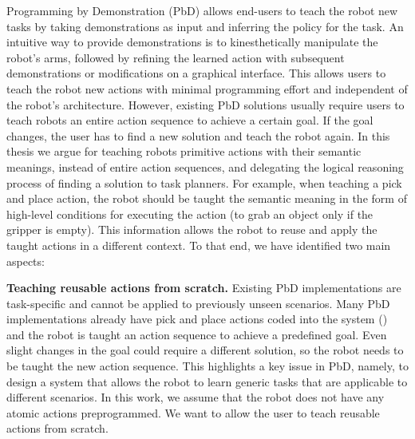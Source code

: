 Programming by Demonstration (PbD) allows end-users to teach the robot new tasks by taking demonstrations as input and inferring the policy for the task.
An intuitive way to provide demonstrations is to kinesthetically manipulate the robot's arms, followed by refining the learned action with subsequent demonstrations or modifications on a graphical interface.
This allows users to teach the robot new actions with minimal programming effort and independent of the robot's architecture.
However, existing PbD solutions usually require users to teach robots an entire action sequence to achieve a certain goal.
If the goal changes, the user has to find a new solution and teach the robot again.
In this thesis we argue for teaching robots primitive actions with their semantic meanings, instead of entire action sequences, and delegating the logical reasoning process of finding a solution to task planners.
For example, when teaching a pick and place action, the robot should be taught the semantic meaning in the form of high-level conditions for executing the action (\eg to grab an object only if the gripper is empty). %
This information allows the robot to reuse and apply the taught actions in a different context.
To that end, we have identified two main aspects:

\textbf{Teaching reusable actions from scratch.}
Existing PbD implementations are task-specific and cannot be applied to previously unseen scenarios.
Many PbD implementations already have pick and place actions coded into the system (\cite{veeraraghavan2008teaching}) and the robot is taught an action sequence to achieve a predefined goal.
Even slight changes in the goal could require a different solution, so the robot needs to be taught the new action sequence.
This highlights a key issue in PbD, namely, to design a system that allows the robot to learn  generic tasks that are applicable to different scenarios.
In this work, we assume that the robot does not have any atomic actions preprogrammed.
We want to allow the user to teach reusable actions from scratch.

